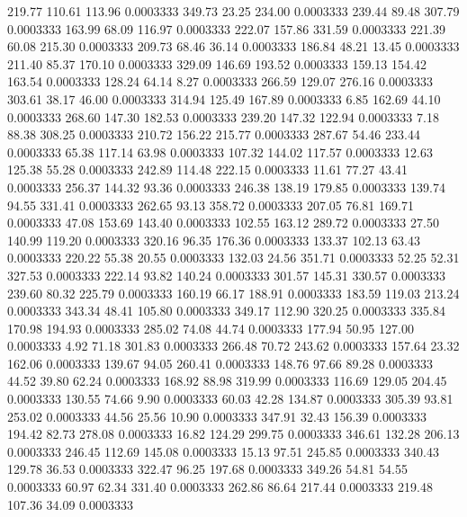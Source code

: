  219.77  110.61  113.96   0.0003333
 349.73   23.25  234.00   0.0003333
 239.44   89.48  307.79   0.0003333
 163.99   68.09  116.97   0.0003333
 222.07  157.86  331.59   0.0003333
 221.39   60.08  215.30   0.0003333
 209.73   68.46   36.14   0.0003333
 186.84   48.21   13.45   0.0003333
 211.40   85.37  170.10   0.0003333
 329.09  146.69  193.52   0.0003333
 159.13  154.42  163.54   0.0003333
 128.24   64.14    8.27   0.0003333
 266.59  129.07  276.16   0.0003333
 303.61   38.17   46.00   0.0003333
 314.94  125.49  167.89   0.0003333
   6.85  162.69   44.10   0.0003333
 268.60  147.30  182.53   0.0003333
 239.20  147.32  122.94   0.0003333
   7.18   88.38  308.25   0.0003333
 210.72  156.22  215.77   0.0003333
 287.67   54.46  233.44   0.0003333
  65.38  117.14   63.98   0.0003333
 107.32  144.02  117.57   0.0003333
  12.63  125.38   55.28   0.0003333
 242.89  114.48  222.15   0.0003333
  11.61   77.27   43.41   0.0003333
 256.37  144.32   93.36   0.0003333
 246.38  138.19  179.85   0.0003333
 139.74   94.55  331.41   0.0003333
 262.65   93.13  358.72   0.0003333
 207.05   76.81  169.71   0.0003333
  47.08  153.69  143.40   0.0003333
 102.55  163.12  289.72   0.0003333
  27.50  140.99  119.20   0.0003333
 320.16   96.35  176.36   0.0003333
 133.37  102.13   63.43   0.0003333
 220.22   55.38   20.55   0.0003333
 132.03   24.56  351.71   0.0003333
  52.25   52.31  327.53   0.0003333
 222.14   93.82  140.24   0.0003333
 301.57  145.31  330.57   0.0003333
 239.60   80.32  225.79   0.0003333
 160.19   66.17  188.91   0.0003333
 183.59  119.03  213.24   0.0003333
 343.34   48.41  105.80   0.0003333
 349.17  112.90  320.25   0.0003333
 335.84  170.98  194.93   0.0003333
 285.02   74.08   44.74   0.0003333
 177.94   50.95  127.00   0.0003333
   4.92   71.18  301.83   0.0003333
 266.48   70.72  243.62   0.0003333
 157.64   23.32  162.06   0.0003333
 139.67   94.05  260.41   0.0003333
 148.76   97.66   89.28   0.0003333
  44.52   39.80   62.24   0.0003333
 168.92   88.98  319.99   0.0003333
 116.69  129.05  204.45   0.0003333
 130.55   74.66    9.90   0.0003333
  60.03   42.28  134.87   0.0003333
 305.39   93.81  253.02   0.0003333
  44.56   25.56   10.90   0.0003333
 347.91   32.43  156.39   0.0003333
 194.42   82.73  278.08   0.0003333
  16.82  124.29  299.75   0.0003333
 346.61  132.28  206.13   0.0003333
 246.45  112.69  145.08   0.0003333
  15.13   97.51  245.85   0.0003333
 340.43  129.78   36.53   0.0003333
 322.47   96.25  197.68   0.0003333
 349.26   54.81   54.55   0.0003333
  60.97   62.34  331.40   0.0003333
 262.86   86.64  217.44   0.0003333
 219.48  107.36   34.09   0.0003333
